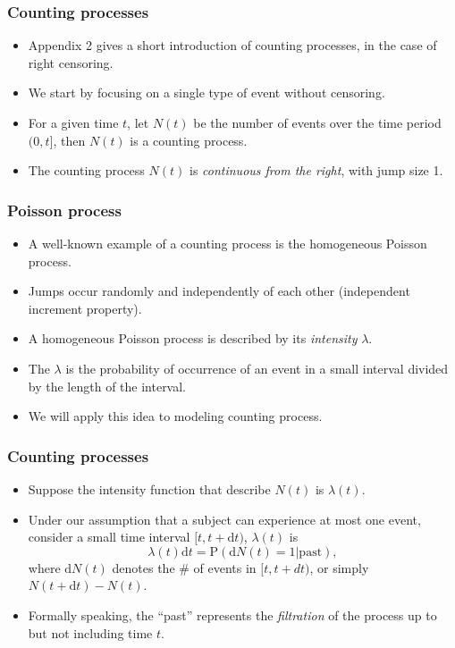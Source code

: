 \documentclass[10pt]{beamer}\usepackage[]{graphicx}\usepackage[]{color}
\newcommand{\dif}{\mathrm{d}}
\newcommand{\dt}{\mathrm{d}t}
\newcommand{\p}{\mathrm{P}}
\begin{document}
\begin{frame}
  \frametitle{Counting processes}
  \begin{itemize}  
  \item Appendix 2 gives a short introduction of counting processes, in the case of right censoring. 
  \item We start by focusing on a single type of event without censoring.
  \item For a given time $t$, let $N(t)$ be the number of events over the time period $(0, t]$, 
    then $N(t)$ is a counting process.
  \item The counting process $N(t)$ is \emph{continuous from the right}, with jump size 1.
  \end{itemize}    
\end{frame}


\begin{frame}
  \frametitle{Poisson process}
  \begin{itemize}  
  \item A well-known example of a counting process is the homogeneous Poisson process.
  \item Jumps occur randomly and independently of each other (independent increment property).
  \item A homogeneous Poisson process is described by its \emph{intensity} $\lambda$.
  \item The $\lambda$ is the probability of occurrence of an event in a small interval divided by the length of the interval.
  \item We will apply this idea to modeling counting process.
  \end{itemize}    
\end{frame}

\begin{frame}
  \frametitle{Counting processes}
  \begin{itemize}  
  \item Suppose the intensity function that describe $N(t)$ is $\lambda(t)$.
  \item Under our assumption that a subject can experience at most one event, 
    consider a small time interval $[t, t + \dt)$,
    $\lambda(t)$ is
    \begin{equation*}
      \lambda(t) \dt = \p(\dif N(t) = 1|\mbox{past}),
    \end{equation*}
    where $\dif N(t)$ denotes the \# of events in $[t, t + dt)$, or simply $N(t + \dt) - N(t)$.
  \item Formally speaking, the ``past'' represents the \emph{filtration} of the process up to but not including time $t$.
  \end{itemize}    
\end{frame}
\end{document}
